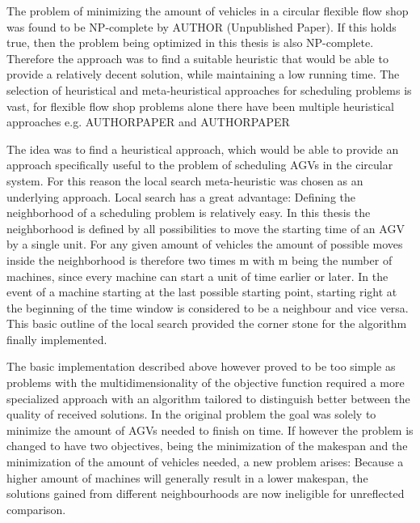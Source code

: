 The problem of minimizing the amount of vehicles in a circular flexible flow shop was found to be NP-complete by AUTHOR (Unpublished Paper). If this
holds true, then the problem being optimized in this thesis is also NP-complete. Therefore the approach was to find a suitable heuristic that would be able to provide a relatively decent
solution, while maintaining a low running time. The selection of heuristical and meta-heuristical approaches for scheduling problems is vast, for
flexible flow shop problems alone there have been multiple heuristical approaches e.g. AUTHORPAPER and AUTHORPAPER

The idea was to find a heuristical approach, which would be able to provide an approach specifically useful to the problem of scheduling AGVs in the circular system. For this reason
the local search meta-heuristic was chosen as an underlying approach. Local search has a great advantage: Defining the neighborhood of
a scheduling problem is relatively easy. In this thesis the neighborhood is defined by all possibilities to move the starting time of an AGV by
a single unit. For any given amount of vehicles the amount of possible moves inside the neighborhood is therefore two times m with m being the number of machines, since every machine
can start a unit of time earlier or later. In the event of a machine starting at the last possible starting point, starting right at the beginning
of the time window is considered to be a neighbour and vice versa. This basic outline of the local search provided the corner stone for the algorithm
finally implemented. 

The basic implementation described above however proved to be too simple as problems with the multidimensionality of the objective function required a more specialized approach with an algorithm
tailored to distinguish better between the quality of received solutions. In the original problem the goal was solely to minimize the amount of AGVs needed to finish on time. If however the problem is changed to
have two objectives, being the minimization of the makespan and the minimization of the amount of vehicles needed, a new problem arises: 
Because a higher amount of machines will generally result in a lower makespan, the solutions gained from different neighbourhoods are now ineligible for unreflected comparison.


